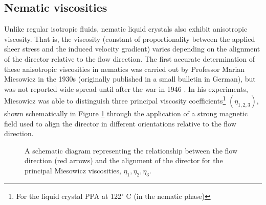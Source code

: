 \subsection{Nematic viscosities}
Unlike regular isotropic fluids, nematic liquid crystals also exhibit anisotropic viscosity. That is, the viscosity (constant of proportionality between the applied sheer stress and the induced velocity gradient) varies depending on the alignment of the director relative to the flow direction.
The first accurate determination of these anisotropic viscosities in nematics was carried out by Professor Marian Miesowicz in the 1930s (originally published in a small bulletin in German), but was not reported wide-spread until after the war in 1946 \cite{Miesowicz1946}. In his experiments, Miesowicz was able to distinguish three principal viscosity coefficients\footnote{For the liquid crystal PPA at 122$^{\circ}$ C (in the nematic phase)} $\left(\eta_{1,2,3}\right)$, shown schematically in Figure \ref{fig:eta} through the application of a strong magnetic field used to align the director in different orientations relative to the flow direction.

\begin{figure}
\begin{center}
\end{center}
\caption{\label{fig:eta} A schematic diagram representing the relationship between the flow direction (red arrows) and the alignment of the director for the principal Miesowicz viscosities, $\eta_1,\eta_2,\eta_3$.}
\end{figure}

